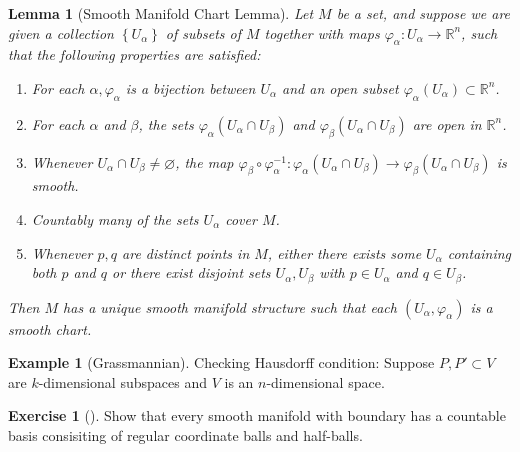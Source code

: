 \documentclass[reqno]{amsart}
\theoremstyle{plain}%
\newtheorem{lemma}[theorem]{Lemma}
\theoremstyle{definition}
\newtheorem{example}[theorem]{Example}
\newtheorem{exercise}[theorem]{Exercise}
\theoremstyle{remark}
\begin{document}
        \begin{lemma}[Smooth Manifold Chart Lemma]
            Let $M$ be a set, and suppose we are given a collection
            $\left\{ U_{\alpha} \right\} $ of subsets of
            $M$ together with maps $\varphi_{\alpha}  \colon
            U_{\alpha}  \to \mathbb{R}^{n}$, such that the following properties
            are satisfied:
            \begin{enumerate}
                \item For each $\alpha, \varphi_{\alpha}$ is a bijection
                    between $U_{\alpha}$ and an open subset
                    $\varphi_{\alpha}\left( U_{\alpha} \right) \subset 
                    \mathbb{R}^{n}$.
                \item For each $\alpha$ and $\beta$, the sets
                    $\varphi_{\alpha}\left( U_{\alpha}\cap U_{\beta} \right) $ 
                    and $\varphi_{\beta}\left( U_{\alpha} \cap U_{\beta}
                    \right) $ are open in $\mathbb{R}^{n}$.
                \item Whenever $U_{\alpha} \cap U_{\beta} \neq \varnothing$,
                    the map $\varphi_{\beta} \circ \varphi_{\alpha}^{-1}  \colon
                    \varphi_{\alpha} \left( U_{\alpha}\cap U_{\beta} \right) \to 
                    \varphi_{\beta} \left( U_{\alpha}\cap U_{\beta} \right)
                    $ is smooth.
                \item Countably many of the sets $U_{\alpha}$ cover $M$.
                \item Whenever $p,q$ are distinct points in $M$, either there
                    exists some $U_{\alpha}$ containing both $p$ and $q$ or
                    there exist disjoint sets $U_{\alpha},U_{\beta}$ with
                    $p \in U_{\alpha}$ and $q \in U_{\beta}$.
            \end{enumerate}
            Then $M$ has a unique smooth manifold structure such that each
            $\left( U_{\alpha}, \varphi_{\alpha} \right) $ is a smooth chart.
        \end{lemma}

        \begin{example}[Grassmannian]
            Checking Hausdorff condition: Suppose
            $P, P' \subset V$ are $k$-dimensional subspaces and $V$ is
            an $n$-dimensional space. 
        \end{example}

        \begin{exercise}[]
            Show that every smooth manifold with boundary has a 
            countable basis
            consisiting of regular coordinate balls and half-balls.
        \end{exercise}
\end{document}
